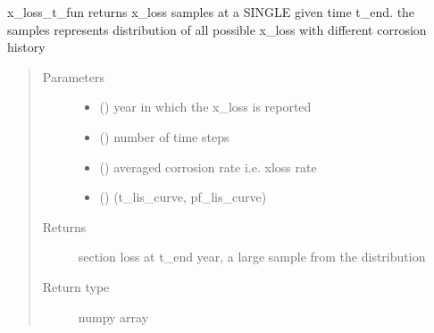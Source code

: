\documentclass[letterpaper,10pt,english]{sphinxmanual}
\begin{document}

\begin{fulllineitems}
\label{\detokenize{corrosion:corrosion.x_loss_t_fun}}
\sphinxAtStartPar
x\_loss\_t\_fun returns x\_loss samples at a SINGLE given time t\_end. the samples represents distribution of all possible x\_loss with
different corrosion history
\begin{quote}\begin{description}
\item[{Parameters}] \leavevmode\begin{itemize}
\item {} 
\sphinxAtStartPar
{} (\sphinxstyleliteralemphasis{\sphinxupquote{, }}) \textendash{} year in which the x\_loss is reported

\item {} 
\sphinxAtStartPar
{} () \textendash{} number of time steps

\item {} 
\sphinxAtStartPar
{} () \textendash{} averaged corrosion rate i.e. x\sphinxhyphen{}loss rate

\item {} 
\sphinxAtStartPar
{} () \textendash{} (t\_lis\_curve, pf\_lis\_curve)

\end{itemize}

\item[{Returns}] \leavevmode
\sphinxAtStartPar
section loss at t\_end year, a large sample from the distribution

\item[{Return type}] \leavevmode
\sphinxAtStartPar
numpy array

\end{description}\end{quote}

\end{fulllineitems}
\end{document}
